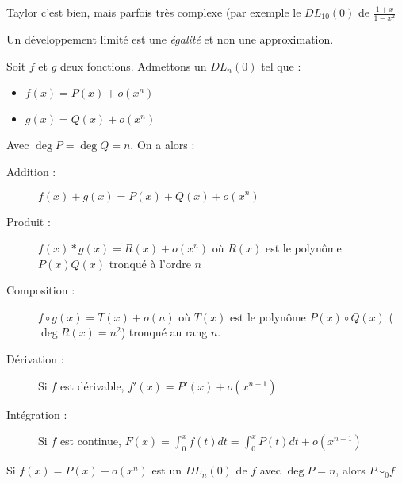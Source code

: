 \remarque{}
Taylor c'est bien, mais parfois très complexe (par exemple le $DL_{10}(0)$ de $\frac{1+x}{1-x^2}$

\remarque{}
Un développement limité est une \emph{égalité} et non une approximation.

Soit $f$ et $g$ deux fonctions. Admettons un $DL_n(0)$ tel que :
\begin{itemize}
	\item $f(x)=P(x)+o(x^n)$
	\item $g(x)=Q(x)+o(x^n)$
\end{itemize}
Avec $\deg P =\deg Q=n$. On a alors :
\begin{description}
	\item[Addition :]$f(x) + g(x) = P(x) + Q(x) + o(x^n)$
	\item[Produit :]$f(x) * g(x) = R(x) + o(x^n)$ où $R(x)$ est le polynôme $P(x)Q(x)$ tronqué à l'ordre $n$
	\item[Composition :]$f\circ g(x) = T(x) + o(n)$ où $T(x)$ est le polynôme $P(x)\circ Q(x)$ ($\deg R(x) = n^2$) tronqué au rang $n$.
	\item[Dérivation :] Si $f$ est dérivable, $f'(x) = P'(x) + o(x^{n-1})$
	\item[Intégration :]Si $f$ est continue, $F(x) = \int_0^x{f(t) dt} =\int_0^x{P(t)dt}+o(x^{n+1})$
\end{description}

\prop{}
Si $f(x) = P(x)+o(x^n)$ est un $DL_n(0)$ de $f$ avec $\deg P=n$, alors $P \sim_0 f$